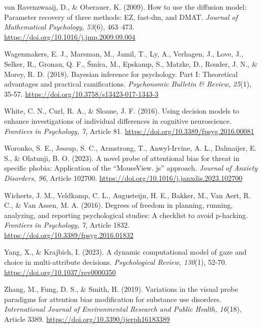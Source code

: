 \documentclass[authordate, empirical]{jote-new-article}
\begin{document}
	van Ravenzwaaij, D., \& Oberauer, K. (2009). How to use the diffusion model: Parameter recovery of three methods: EZ, fast-dm, and DMAT. \emph{Journal of Mathematical Psychology, 53}(6), 463--473. \url{https://doi.org/10.1016/j.jmp.2009.09.004}



	Wagenmakers, E. J., Marsman, M., Jamil, T., Ly, A., Verhagen, J., Love, J., Selker, R., Gronau, Q. F., Šmíra, M., Epskamp, S., Matzke, D., Rouder, J. N., \& Morey, R. D. (2018). Bayesian inference for psychology. Part I: Theoretical advantages and practical ramifications. \emph{Psychonomic Bulletin \& Review, 25}(1), 35-57. \url{https://doi.org/10.3758/s13423-017-1343-3}



	White, C. N., Curl, R. A., \& Sloane, J. F. (2016). Using decision models to enhance investigations of individual differences in cognitive neuroscience. \emph{Frontiers in Psychology, 7}, Article 81. \url{https://doi.org/10.3389/fpsyg.2016.00081}



	Woronko, S. E., Jessup, S. C., Armstrong, T., Anwyl-Irvine, A. L., Dalmaijer, E. S., \& Olatunji, B. O. (2023). A novel probe of attentional bias for threat in specific phobia: Application of the “MouseView. js” approach. \emph{Journal of Anxiety Disorders, 96}, Article 102700. \url{https://doi.org/10.1016/j.janxdis.2023.102700}



	Wicherts, J. M., Veldkamp, C. L., Augusteijn, H. E., Bakker, M., Van Aert, R. C., \& Van Assen, M. A. (2016). Degrees of freedom in planning, running, analyzing, and reporting psychological studies: A checklist to avoid p-hacking. \emph{Frontiers in Psychology, 7}, Article 1832. \url{https://doi.org/10.3389/fpsyg.2016.01832}



	Yang, X., \& Krajbich, I. (2023). A dynamic computational model of gaze and choice in multi-attribute decisions. \emph{Psychological Review, 130}(1), 52-70. \url{https://doi.org/10.1037/rev0000350}



	Zhang, M., Fung, D. S., \& Smith, H. (2019). Variations in the visual probe paradigms for attention bias modification for substance use disorders. \emph{International Journal of Environmental Research and Public Health, 16}(18), Article 3389. \url{https://doi.org/10.3390/ijerph16183389}
\end{document}
